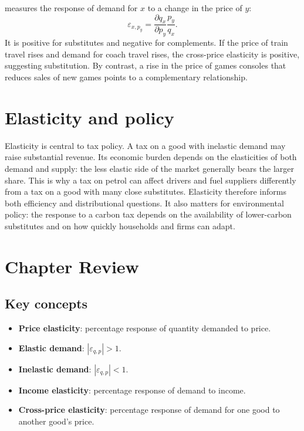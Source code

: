  measures the response of demand for $x$ to a change in the price of $y$:
\[
\varepsilon_{x,p_y}=\frac{\partial q_x}{\partial p_y}\frac{p_y}{q_x}.
\]
It is positive for substitutes and negative for complements. If the price of
train travel rises and demand for coach travel rises, the cross-price
elasticity is positive, suggesting substitution. By contrast, a rise in the
price of games consoles that reduces sales of new games points to a
complementary relationship.

\section{Elasticity and policy}

Elasticity is central to tax policy. A tax on a good with inelastic demand may
raise substantial revenue. Its economic burden depends on the elasticities of
both demand and supply: the less elastic side of the market generally bears
the larger share. This is why a tax on petrol can affect drivers and fuel
suppliers differently from a tax on a good with many close substitutes.
Elasticity therefore informs both efficiency and distributional questions. It
also matters for environmental policy: the response to a carbon tax depends on
the availability of lower-carbon substitutes and on how quickly households and
firms can adapt.

\section*{Chapter Review}

\subsection*{Key concepts}
\begin{itemize}
  \item \textbf{Price elasticity}: percentage response of quantity demanded to price.
  \item \textbf{Elastic demand}: $|\varepsilon_{q,p}|>1$.
  \item \textbf{Inelastic demand}: $|\varepsilon_{q,p}|<1$.
  \item \textbf{Income elasticity}: percentage response of demand to income.
  \item \textbf{Cross-price elasticity}: percentage response of demand for one good to another good's price.
\end{itemize}

